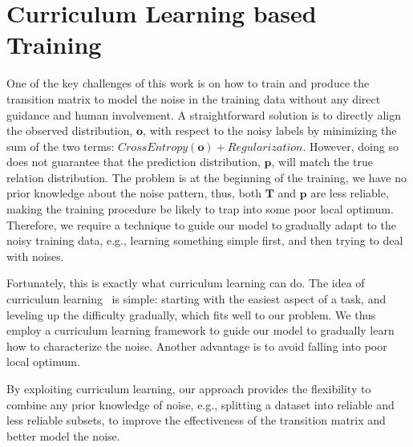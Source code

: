 \section{Curriculum Learning based Training \label{sec:training}}

One of the key challenges of this work is  on how to train and produce the transition matrix to model the noise  in the training data without any direct guidance and human involvement.
A straightforward solution is to directly align the observed distribution, $\mathbf{o}$, with respect to the noisy labels by minimizing the sum of the two terms:
$CrossEntropy(\mathbf{o}) + Regularization$. However, doing so
does not guarantee that the prediction distribution, $\mathbf{p}$, will match the true relation distribution.
The problem is at the beginning of the training, we have no prior knowledge about the noise pattern, 
thus, both  $\mathbf{T}$ and $\mathbf{p}$ are less reliable, making the training procedure be likely to trap into some poor local optimum.
Therefore, we require a technique to guide our model to gradually adapt to the noisy training data, e.g., learning something simple first, and then trying to deal with noises.

Fortunately, this is exactly what curriculum learning can do.
The idea of curriculum learning~\cite{bengio2009curriculum} is simple: starting with the easiest aspect of a task, and leveling up the difficulty gradually,
which fits well to our problem.
We thus employ a curriculum
learning framework to guide our model to gradually learn how to characterize the noise. 
Another advantage is to avoid falling into poor local optimum.


By exploiting curriculum learning, our approach  provides the
flexibility to combine any prior knowledge of noise, e.g., splitting a dataset into reliable and less reliable subsets,  to improve the
effectiveness of  the transition matrix and better model the noise.



